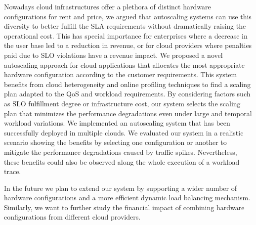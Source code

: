 
Nowadays cloud infrastructures offer a plethora of distinct hardware configurations for rent and price, we argued that autoscaling systems can use this diversity to better fulfill the SLA requirements without dramatically raising the operational cost. This has special importance for enterprises where a decrease in the user base led to a reduction in revenue, or for cloud providers where penalties paid due to SLO violations have a revenue impact. We proposed a novel autoscaling approach for cloud applications that allocates the most appropriate hardware configuration according to the customer requirements. This system benefits from cloud heterogeneity and online profiling techniques to find a scaling plan adapted to the QoS and workload requirements. By considering factors such as SLO fulfillment degree or infrastructure cost, our system selects the scaling plan that minimizes the performance degradations even under large and temporal workload variations. We implemented an autoscaling system that has been successfully deployed in multiple clouds. We evaluated our system in a realistic scenario showing the benefits by selecting one configuration or another to mitigate the performance degradations caused by traffic spikes. Nevertheless, these benefits could also be observed along the whole execution of a workload trace. 

In the future we plan to extend our system by supporting a wider number of hardware configurations and a more efficient dynamic load balancing mechanism. Similarly, we want to further study the financial impact of combining hardware configurations from different cloud providers.








